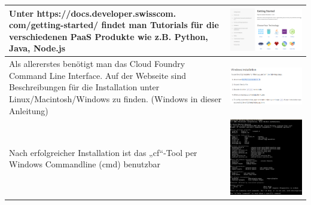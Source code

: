 \begin{longtable}{| p{5cm} | p{11cm} |}
\hline
Unter https://docs.developer.swisscom. com/getting-started/ 
findet man Tutorials für die verschiedenen PaaS Produkte wie z.B. Python, Java, Node.js
&\includegraphics[width=0.65\columnwidth, valign=T]{images/image1.png}\\ \hline
Als allererstes benötigt man das Cloud Foundry Command Line Interface. Auf der Webseite sind Beschreibungen für die Installation unter Linux/Macintosh/Windows zu finden. (Windows in dieser Anleitung) 
&\includegraphics[width=0.65\columnwidth, valign=T]{images/image2.png} \\ \hline
Nach erfolgreicher Installation ist das „cf“-Tool per Windows Commandline (cmd) benutzbar&\includegraphics[width=0.65\columnwidth, valign=T]{images/image3.png} \\ \hline

\end{longtable}
